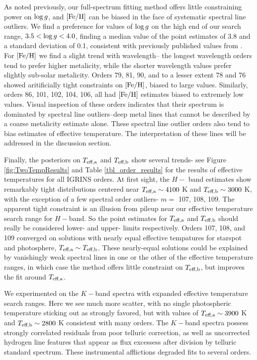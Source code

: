 \documentclass[twocolumn]{emulateapj}%
\begin{document}
As noted previously, our full-spectrum fitting method offers little constraining power on $\log g$, and $[{\rm Fe}/{\rm H}]$ can be biased in the face of systematic spectral line outliers.  We find a preference for values of $\log g$ on the high end of our search range, $3.5 <\log g <4.0$, finding a median value of the point estimates of 3.8 and a standard deviation of 0.1, consistent with previously published values from \citet{donati14}.  For $[{\rm Fe}/{\rm H}]$ we find a slight trend with wavelength-- the longest wavelength orders tend to prefer higher metalicity, while the shorter wavelength values prefer slightly sub-solar metalicity.  Orders 79, 81, 90, and to a lesser extent 78 and 76 showed aritificially tight constraints on $[{\rm Fe}/{\rm H}]$, biased to large values.  Similarly, orders 86, 101, 102, 104, 106, all had $[{\rm Fe}/{\rm H}]$ estimates biased to extremely low values.   Visual inspection of these orders indicates that their spectrum is dominated by spectral line outliers--deep metal lines that cannot be described by a coarse metalicity estimate alone.  These spectral line outlier orders also tend to bias estimates of effective temperature.  The interpretation of these lines will be addressed in the discussion section.  

Finally, the posteriors on $T_\textrm{eff,a}$ and $T_\textrm{eff,b}$ show several trends- see Figure \ref{fig:TwoTempResults} and Table \ref{tbl_order_results} for the results of effective temperatures for all IGRINS orders.  At first sight, the $H-$ band estimates show remarkably tight distributions centered near $T_\textrm{eff,a}\sim4100$ K and $T_\textrm{eff,b}\sim3000$ K, with the exception of a few spectral order outliers- $m=$ 107, 108, 109. The apparent tight constraint is an illusion from pileup near our effective temperature search range for $H-$band.  So the point estimates for $T_\textrm{eff,a}$ and $T_\textrm{eff,b}$ should really be considered lower- and upper- limits respectively.  Orders 107, 108, and 109 converged on solutions with nearly equal effective tempatures for starspot and photosphere, $T_\textrm{eff,a} \sim T_\textrm{eff,b}$.  These nearly-equal solutions could be explained by vanishingly weak spectral lines in one or the other of the effective temperature ranges, in which case the method offers little constraint on $T_\textrm{eff,b}$, but improves the fit around $T_\textrm{eff,a}$.  

We experimented on the $K-$band spectra with expanded effective temperature search ranges.  Here we see much more scatter, with no single photospheric temperature sticking out as strongly favored, but with values of $T_\textrm{eff,a} \sim 3900$ K and $T_\textrm{eff,b} \sim 2800$ K consistent with many orders.  The $K-$band spectra possess strongly correlated residuals from poor telluric correction, as well as uncorrected hydrogen line features that appear as flux excessess after division by telluric standard spectrum.  These instrumental afflictions degraded fits to several orders.
\end{document}
